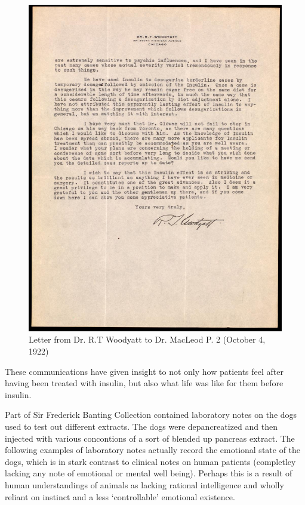 \documentclass[12pt]{article}
\begin{document}
\begin{figure}[H]
\centering
  \includegraphics [width=5in]{mental_manp2}
  \caption{Letter from Dr. R.T Woodyatt to Dr. MacLeod P. 2 (October 4, 1922)}
  \label{fig: Letter from Dr. R. T. Woodyatt to Dr. MacLeod P. 2}
\end{figure}

These communications have given insight to not only how patients feel after having been treated with insulin, but also what life was like for them before insulin. 

Part of Sir Frederick Banting Collection contained laboratory notes on the dogs used to test out different extracts. The dogs were depancreatized and then injected with various concontions of a sort of blended up pancreas extract. The following examples of laboratory notes actually record the emotional state of the dogs, which is in stark contrast to clinical notes on human patients (completley lacking any note of emotional or mental well being). Perhaps this is a result of human understandings of animals as lacking rational intelligence and wholly reliant on instinct and a less `controllable' emotional existence. 
\end{document}
